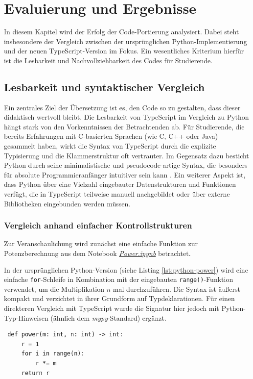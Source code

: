 \section{Evaluierung und Ergebnisse}
In diesem Kapitel wird der Erfolg der Code-Portierung analysiert. Dabei steht insbesondere der Vergleich zwischen der ursprünglichen Python-Implementierung und der neuen TypeScript-Version im Fokus. Ein wesentliches Kriterium hierfür ist die Lesbarkeit und Nachvollziehbarkeit des Codes für Studierende.

\subsection{Lesbarkeit und syntaktischer Vergleich}
Ein zentrales Ziel der Übersetzung ist es, den Code so zu gestalten, dass dieser didaktisch wertvoll bleibt. Die Lesbarkeit von TypeScript im Vergleich zu Python hängt stark von den Vorkenntnissen der Betrachtenden ab. Für Studierende, die bereits Erfahrungen mit C-basierten Sprachen (wie C, C++ oder Java) gesammelt haben, wirkt die Syntax von TypeScript durch die explizite Typisierung und die Klammerstruktur oft vertrauter. Im Gegensatz dazu besticht Python durch seine minimalistische und pseudocode-artige Syntax, die besonders für absolute Programmieranfänger intuitiver sein kann \cite{objective-comparison}. Ein weiterer Aspekt ist, dass Python über eine Vielzahl eingebauter Datenstrukturen und Funktionen verfügt, die in TypeScript teilweise manuell nachgebildet oder über externe Bibliotheken eingebunden werden müssen.

\subsubsection{Vergleich anhand einfacher Kontrollstrukturen}
Zur Veranschaulichung wird zunächst eine einfache Funktion zur Potenzberechnung aus dem Notebook \href{https://github.com/zLeoll/TS-Translation-for-TheoInf/blob/main/Algorithms/Chapter-03/Power.ipynb}{\textit{Power.ipynb}} betrachtet.

In der ursprünglichen Python-Version (siehe Listing \ref{lst:python-power}) wird eine einfache \texttt{for}-Schleife in Kombination mit der eingebauten \texttt{range()}-Funktion verwendet, um die Multiplikation $n$-mal durchzuführen. Die Syntax ist äußerst kompakt und verzichtet in ihrer Grundform auf Typdeklarationen. Für einen direkteren Vergleich mit TypeScript wurde die Signatur hier jedoch mit Python-Typ-Hinweisen (ähnlich dem \textit{mypy}-Standard) ergänzt.
\begin{verbatim}
 def power(m: int, n: int) -> int:
     r = 1
     for i in range(n):
         r *= m
     return r
\end{verbatim}
\label{lst:python-power}

